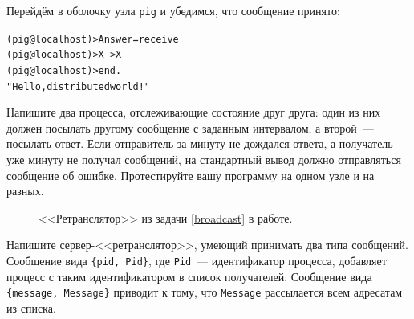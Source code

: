 \documentclass[
  paper=a4,
  fontsize=14pt,
  openany,
  appendixprefix=true
]{scrbook}
\begin{document}
Перейдём в оболочку узла \lstinline{pig}  и убедимся, что сообщение принято:

\begin{alltt}
(pig@localhost)> Answer = receive
(pig@localhost)>             X -> X
(pig@localhost)>          end.
"Hello, distributed world!"
\end{alltt}
\addtocounter{erlcommand}{1}
%


\begin{problem}\label{check}
Напишите два процесса, отслеживающие состояние друг друга: один из них должен посылать другому сообщение с заданным интервалом, а второй~--- посылать ответ. Если отправитель за минуту не дождался ответа, а получатель уже минуту не получал сообщений, на стандартный вывод должно отправляться сообщение об ошибке. Протестируйте вашу программу на одном узле и на разных.
\end{problem}

\begin{figure}[!t,hellodistr]
  \centering
  \begin{sequencediagram}



  \end{sequencediagram}
  \caption{<<Ретранслятор>> из задачи \ref{broadcast} в работе.}
  \label{hellodistr}
\end{figure}

\begin{problem}\label{broadcast}

Напишите сервер-<<ретранслятор>>, умеющий принимать два типа сообщений. Сообщение вида \lstinline!{pid, Pid}!, где \lstinline{Pid}~--- идентификатор процесса, добавляет процесс с таким идентификатором в список получателей. Сообщение вида \lstinline!{message, Message}! приводит к тому, что \lstinline{Message} рассылается всем адресатам из списка.
\end{problem}
\end{document}
